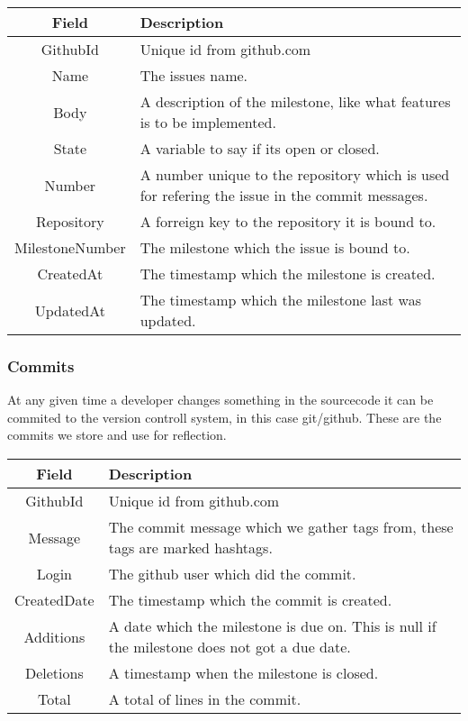 \vspace{0.5cm}
\begin{tabularx}{\linewidth}{| c | X |}
    \hline
    \rowcolor[gray]{0.8}
    \textbf{Field} & \textbf{Description} \\
    \hline
    GithubId & Unique id from github.com\\ \hline
    Name & The issues name.\\ \hline
   	Body & A description of the milestone, like what features is to be implemented.\\ \hline
    State & A variable to say if its open or closed.\\ \hline
    Number & A number unique to the repository which is used for refering the issue in the commit messages.\\ \hline
    Repository & A forreign key to the repository it is bound to.\\ \hline
    MilestoneNumber & The milestone which the issue is bound to.\\ \hline
    CreatedAt & The timestamp which the milestone is created.\\ \hline
    UpdatedAt & The timestamp which the milestone last was updated.\\ 
    \hline
\end{tabularx}
\vspace{0.5cm}

\subsubsection*{Commits}
At any given time a developer changes something in the sourcecode it can be commited to the version controll system, in this case git/github. These are the commits we store and use for reflection. \\

\vspace{0.5cm}
\begin{tabularx}{\linewidth}{| c | X |}
    \hline
    \rowcolor[gray]{0.8}
    \textbf{Field} & \textbf{Description} \\
    \hline
    GithubId & Unique id from github.com\\ \hline
    Message & The commit message which we gather tags from, these tags are marked hashtags.\\ \hline
   	Login & The github user which did the commit.\\ \hline
    CreatedDate & The timestamp which the commit is created.\\ \hline
    Additions & A date which the milestone is due on. This is null if the milestone does not got a due date.\\ \hline
    Deletions & A timestamp when the milestone is closed.\\ \hline
    Total & A total of lines in the commit.\\
    \hline
\end{tabularx}
\vspace{0.5cm}


